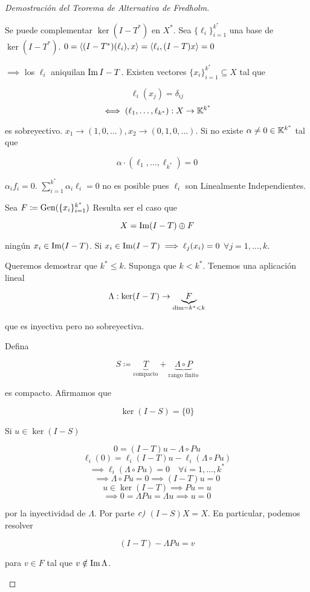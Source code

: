 \begin{proof}[Demostración del Teorema de Alternativa de Fredholm]
\begin{enumerate}[label=\alph*)]
      Se puede complementar $\ker (I-T^*)$ en $X^*$. Sea $\{\ell_i\}_{i=1}^{k^*}$ una base de $\ker (I-T^*)$. $0=\left\langle (I-T^*)(\ell_i),x\right\rangle=\left\langle \ell_i,(I-T)x\right\rangle=0$

      $\implies$ los $\ell_i$ aniquilan $\operatorname{Im} I-T$. Existen vectores $\{x_i\}_{i=1}^{k^*}\subseteq X$ tal que 

      \[\ell_i(x_j)=\delta_{ij}\]
      \[\iff (\ell_1,\ldots,\ell_{k^*}):X\to \mathbb{K}^{k^*}\]

      es sobreyectivo. $x_1\to (1,0,\ldots), x_2\to (0,1,0,\ldots)$. Si no existe $ \alpha\neq 0\in \mathbb{K}^{k^*}$ tal que 

      \[\alpha\cdot (\ell_1,\ldots,\ell_{k^*})=0\]

      $\alpha_i f_i=0$. $\sum_{i=1}^{k^*} \alpha_i\ell_i=0$ no es posible pues $\ell_i$ son Linealmente Independientes.

      Sea $F\coloneqq \operatorname{Gen}(\{x_i\}_{i=1}^{k^*})$ Resulta ser el caso que 

      \[X=\operatorname{Im} (I-T)\oplus F\]

      ningún $x_i\in \operatorname{Im} (I-T)$. Si $x_i\in \operatorname{Im} (I-T)\implies \ell_j(x_i)=0$ $\forall j=1,\ldots,k$.

      Queremos demostrar que $k^*\leq k$. Suponga que $k< k^*$. Tenemos una aplicación lineal 

      \[\Lambda:\ker (I-T)\to \underbrace{F}_{\operatorname{dim}=k^*<k}\]

      que es inyectiva pero no sobreyectiva.

      Defina

      \[S\coloneqq \underbrace{T}_{\text{compacto}}+\underbrace{\Lambda\circ P}_{\text{rango finito}}\]

      es compacto. Afirmamos que 

      \[\ker (I-S)=\{0\}\]

      Si $u\in \ker(I-S)$ 

      \[0=(I-T)u-\Lambda\circ Pu\] 
      \[\ell_i(0)=\ell_i(I-T)u-\ell_i(\Lambda\circ Pu)\]
      \[\implies \ell_i(\Lambda\circ Pu)=0\quad \forall i=1,\ldots,k^*\]
      \[\implies \Lambda\circ Pu=0\implies (I-T)u=0\]
      \[u\in \ker (I-T)\implies Pu=u\]
      \[\implies 0=\Lambda Pu=\Lambda u\implies u=0\]

      por la inyectividad de $\Lambda$. Por parte $\emph{c)}$ $(I-S)X=X$. En particular, podemos resolver 

      \[(I-T)-\Lambda Pu=v\]

      para $v\in F$ tal que $v\notin \operatorname{Im} \Lambda$.


\end{enumerate}
\end{proof}

